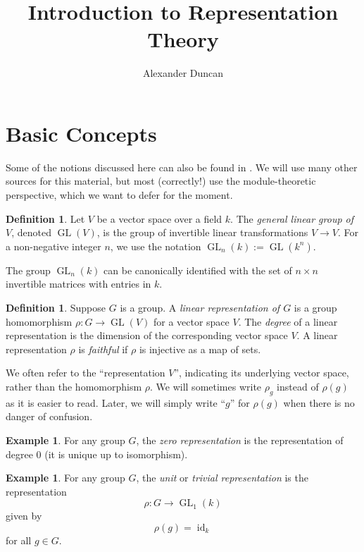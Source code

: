 \documentclass[12pt]{article}
\theoremstyle{plain}
\theoremstyle{definition}
\newtheorem{definition}[theorem]{Definition}
\newtheorem{example}[theorem]{Example}
\theoremstyle{remark}
\numberwithin{equation}{section}
\begin{document}
\title{Introduction to Representation Theory}
\author{Alexander Duncan}

\maketitle

\section{Basic Concepts}

Some of the notions discussed here can also be found in
\cite[\S{1}]{Serre}.
We will use many other sources for this material,
but most (correctly!) use the module-theoretic perspective,
which we want to defer for the moment.

\begin{definition}
Let $V$ be a vector space over a field $k$.
The \emph{general linear group of $V$}, denoted $\operatorname{GL}(V)$, is the group
of invertible linear transformations $V \to V$.
For a non-negative integer $n$, we use the notation
$\operatorname{GL}_n(k) := \operatorname{GL}(k^n)$.
\end{definition}

The group $\operatorname{GL}_n(k)$ can be canonically identified with the set of $n
\times n$ invertible matrices with entries in $k$.

\begin{definition}
Suppose $G$ is a group.  A \emph{linear representation of $G$} is a
group homomorphism $\rho : G \to \operatorname{GL}(V)$ for a vector space $V$.
The \emph{degree} of a linear representation is the dimension of the
corresponding vector space $V$.
A linear representation $\rho$ is \emph{faithful} if $\rho$ is injective
as a map of sets.
\end{definition}

We often refer to the ``representation $V$'', indicating its underlying
vector space, rather than the homomorphism $\rho$.
We will sometimes write $\rho_g$ instead of $\rho(g)$ as it is easier
to read.  Later, we will simply write ``$g$'' for $\rho(g)$ when there
is no danger of confusion.

\begin{example}
For any group $G$,
the \emph{zero representation} is the representation of degree
$0$ (it is unique up to isomorphism).
\end{example}

\begin{example}
For any group $G$,
the \emph{unit} or \emph{trivial representation} is the representation
\[ \rho: G \to \operatorname{GL}_1(k) \]
given by
\[
\rho(g)=\operatorname{id}_k
\]
for all $g \in G$.
\end{example}
\end{document}

